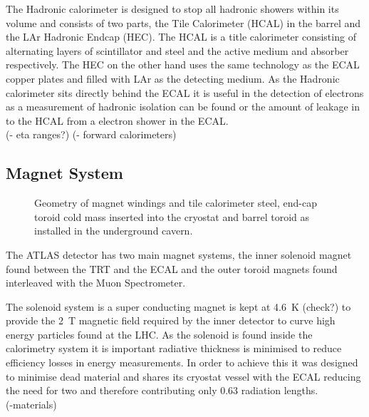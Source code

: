 		The Hadronic calorimeter is designed to stop all hadronic showers within its volume and consists of two parts, the Tile Calorimeter (HCAL) in the barrel and the LAr Hadronic Endcap (HEC). The HCAL is a title calorimeter consisting of alternating layers of scintillator and steel and the active medium and absorber respectively. The HEC on the other hand uses the same technology as the ECAL copper plates and filled with LAr as the detecting medium. As the Hadronic calorimeter sits directly behind the ECAL it is useful in the detection of electrons as a measurement of hadronic isolation can be found or the amount of leakage in to the HCAL from a electron shower in the ECAL.\\
		(- eta ranges?)
		(- forward calorimeters)
		


	\subsection{Magnet System}

		
		\begin{figure}[h]
			\begin{center}
			\end{center}
			\caption{Geometry of magnet windings and tile calorimeter steel, end-cap toroid cold mass inserted into the cryostat and barrel toroid as installed in the underground cavern.}
			\label{fig:ATLAS_magnet}
		\end{figure}

		The ATLAS detector has two main magnet systems, the inner solenoid magnet found between the TRT and the ECAL and the outer toroid magnets found interleaved with the Muon Spectrometer. 

		The solenoid system is a super conducting magnet is kept at \SI{4.6}{\K} (check?) to provide the \SI{2}{T} magnetic field required by the inner detector to curve high energy particles found at the LHC. As the solenoid is found inside the calorimetry system it is important radiative thickness is minimised to reduce efficiency losses in energy measurements. In order to achieve this it was designed to minimise dead material and shares its cryostat vessel with the ECAL reducing the need for two and therefore contributing only 0.63 radiation lengths.\\ 
		(-materials)

